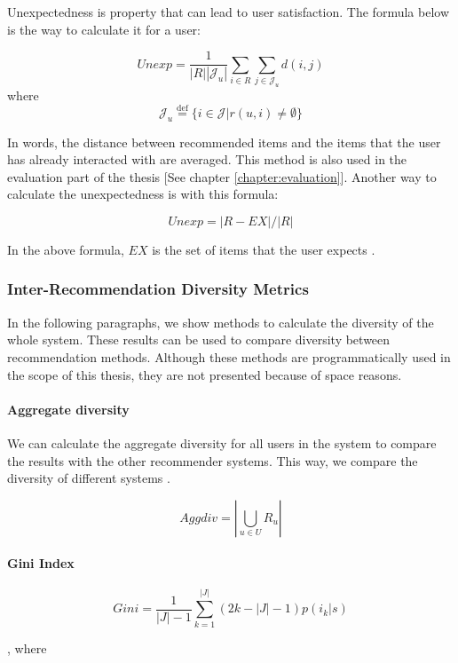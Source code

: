 Unexpectedness is property that can lead to user satisfaction. The formula below is the way to calculate it for a user:

$$
Unexp = \frac { 1 } { | R | \left| \mathcal { J } _ { u } \right| } \sum _ { i \in R } \sum _ { j \in \mathcal { J } _ { u } } d ( i , j )
$$
where 
$$
\mathcal { J } _ { u } \stackrel { \mathrm { def } } { = } \{ i \in \mathcal { J } | r ( u , i ) \neq \emptyset \}
$$

In words, the distance between recommended items and the items that the user has already interacted with are averaged. This method is also used in the evaluation part of the thesis [See chapter \ref{chapter:evaluation}]. Another way to calculate the unexpectedness is with this formula: 

$$
Unexp = | R - E X | / | R |
$$

In the above formula, $EX$ is the set of items that the user expects \cite{castells2015novelty}.

\subsubsection{Inter-Recommendation Diversity Metrics}

In the following paragraphs, we show methods to calculate the diversity of the whole system. These results can be used to compare diversity between recommendation methods. Although these methods are programmatically used in the scope of this thesis, they are not presented because of space reasons.

\paragraph{Aggregate diversity}

We can calculate the aggregate diversity for all users in the system to compare the results with the other recommender systems. This way, we compare the diversity of different systems \cite{castells2015novelty}.

$$
Aggdiv = \left| \bigcup _ { u \in{ U } } R _ { u } \right|
$$

\paragraph{Gini Index}

$$
Gini = \frac { 1 } { |{ J } | - 1 } \sum _ { k = 1 } ^ { | J | } ( 2 k - | J |  - 1 ) p \left( i _ { k } | s \right)
$$

, where


